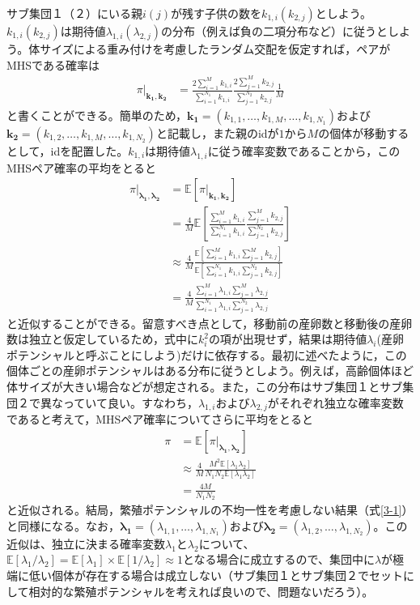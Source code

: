 \documentclass[AMA,STIX1COL]{WileyNJD-v2}
\begin{document}
サブ集団１（２）にいる親$i(j)$が残す子供の数を$k_{1,i}(k_{2,j})$としよう。$k_{1,i}(k_{2,j})$は期待値$\lambda_{1,i}(\lambda_{2,j})$の分布（例えば負の二項分布など）に従うとしよう。体サイズによる重み付けを考慮したランダム交配を仮定すれば，ペアがMHSである確率は
\begin{align}
\pi | _{\boldsymbol{k_1, k_2}} &= \frac{ 2\sum_{i=1}^M k_{1,i} } { \sum_{i=1}^{N_1} k_{1,i} } \frac{ 2\sum_{j=1}^M k_{2,j} } { \sum_{j=1}^{N_2} k_{2,j} } \frac{1}{M} 
\end{align}
と書くことができる。簡単のため，$\boldsymbol{k_1}=(k_{1,1}, \ldots, k_{1,M}, \ldots, k_{1,N_1})$および$\boldsymbol{k_2}=(k_{1,2}, \ldots, k_{1,M}, \ldots, k_{1,N_2})$と記載し，また親のidが$1$から$M$の個体が移動するとして，idを配置した。$k_{1,i}$は期待値$\lambda_{1,i}$に従う確率変数であることから，このMHSペア確率の平均をとると
\begin{align}
\pi | _{\boldsymbol{\lambda_1, \lambda_2}} &= \mathbb{E}[\pi | _{\boldsymbol{k_1, k_2}}] \nonumber\\
&= \frac{4}{M} \mathbb{E}\left[\frac{ \sum_{i=1}^M k_{1,i} } { \sum_{i=1}^{N_1} k_{1,i} } \frac{ \sum_{j=1}^M k_{2,j} } { \sum_{j=1}^{N_2} k_{2,j} } \right]   \nonumber\\
&\approx \frac{4}{M} \frac{ \mathbb{E}\left[ \sum_{i=1}^M k_{1,i} \sum_{j=1}^M k_{2,j} \right] } {\mathbb{E}\left[ \sum_{i=1}^{N_1} k_{1,i} \sum_{j=1}^{N_2} k_{2,j}\right]} \nonumber\\
&= \frac{4}{M} \frac{ \sum_{i=1}^M \lambda_{1,i} \sum_{j=1}^M \lambda_{2,j} } {\sum_{i=1}^{N_1} \lambda_{1,i} \sum_{j=1}^{N_2} \lambda_{2,j}} 
\end{align}
と近似することができる。留意すべき点として，移動前の産卵数と移動後の産卵数は独立と仮定しているため，式中に$k_i^2$の項が出現せず，結果は期待値$\lambda_i$(産卵ポテンシャルと呼ぶことにしよう)だけに依存する。最初に述べたように，この個体ごとの産卵ポテンシャルはある分布に従うとしよう。例えば，高齢個体ほど体サイズが大きい場合などが想定される。また，この分布はサブ集団１とサブ集団２で異なっていて良い。すなわち，$\lambda_{1,i}$および$\lambda_{2,j}$がそれぞれ独立な確率変数であると考えて，MHSペア確率についてさらに平均をとると
\begin{align}
\pi &= \mathbb{E}[\pi | _{\boldsymbol{\lambda_1, \lambda_2}}] \nonumber\\ 
&\approx \frac{4}{M} \frac{M^2 \mathbb{E}[\lambda_1 \lambda_2]}{N_1 N_2 \mathbb{E}[\lambda_1 \lambda_2]}\nonumber\\
&= \frac{4M}{N_{1}N_{2}}
\label{4-1}
\end{align}
と近似される。結局，繁殖ポテンシャルの不均一性を考慮しない結果（式\ref{3-1}）と同様になる。なお，$\boldsymbol{\lambda_1}=(\lambda_{1,1}, \ldots, \lambda_{1,N_1})$および$\boldsymbol{\lambda_2}=(\lambda_{1,2}, \ldots, \lambda_{1,N_2})$。この近似は、独立に決まる確率変数$\lambda_1$と$\lambda_2$について、$\mathbb{E}[\lambda_1/\lambda_2]=\mathbb{E}[\lambda_1] \times \mathbb{E}[1/\lambda_2] \approx 1$となる場合に成立するので、集団中に$\lambda$が極端に低い個体が存在する場合は成立しない（サブ集団１とサブ集団２でセットにして相対的な繁殖ポテンシャルを考えれば良いので、問題ないだろう）。
\end{document}
